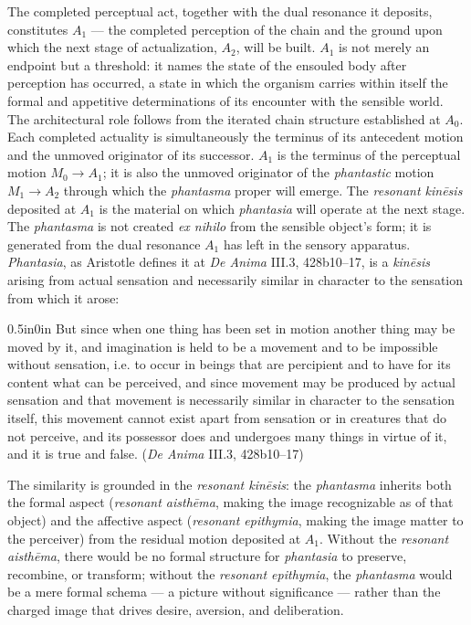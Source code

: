 \documentclass{article}
\begin{document}
The completed perceptual act, together with the dual resonance it deposits, constitutes $A_1$ --- the completed perception of the chain and the ground upon which the next stage of actualization, $A_2$, will be built. $A_1$ is not merely an endpoint but a threshold: it names the state of the ensouled body after perception has occurred, a state in which the organism carries within itself the formal and appetitive determinations of its encounter with the sensible world. The architectural role follows from the iterated chain structure established at $A_0$. Each completed actuality is simultaneously the terminus of its antecedent motion and the unmoved originator of its successor. $A_1$ is the terminus of the perceptual motion $M_0 \rightarrow A_1$; it is also the unmoved originator of the \textit{phantastic} motion $M_1 \rightarrow A_2$ through which the \textit{phantasma} proper will emerge. The \textit{resonant kinēsis} deposited at $A_1$ is the material on which \textit{phantasia} will operate at the next stage. The \textit{phantasma} is not created \textit{ex nihilo} from the sensible object's form; it is generated from the dual resonance $A_1$ has left in the sensory apparatus. \textit{Phantasia}, as Aristotle defines it at \textit{De Anima} III.3, 428b10--17, is a \textit{kinēsis} arising from actual sensation and necessarily similar in character to the sensation from which it arose:
\begin{adjustwidth}{0.5in}{0in}
But since when one thing has been set in motion another thing may be moved by it, and imagination is held to be a movement and to be impossible without sensation, i.e. to occur in beings that are percipient and to have for its content what can be perceived, and since movement may be produced by actual sensation and that movement is necessarily similar in character to the sensation itself, this movement cannot exist apart from sensation or in creatures that do not perceive, and its possessor does and undergoes many things in virtue of it, and it is true and false. (\textit{De Anima} III.3, 428b10--17)
\end{adjustwidth}
The similarity is grounded in the \textit{resonant kinēsis}: the \textit{phantasma} inherits both the formal aspect (\textit{resonant aisthēma}, making the image recognizable as of that object) and the affective aspect (\textit{resonant epithymia}, making the image matter to the perceiver) from the residual motion deposited at $A_1$. Without the \textit{resonant aisthēma}, there would be no formal structure for \textit{phantasia} to preserve, recombine, or transform; without the \textit{resonant epithymia}, the \textit{phantasma} would be a mere formal schema --- a picture without significance --- rather than the charged image that drives desire, aversion, and deliberation.
\end{document}

